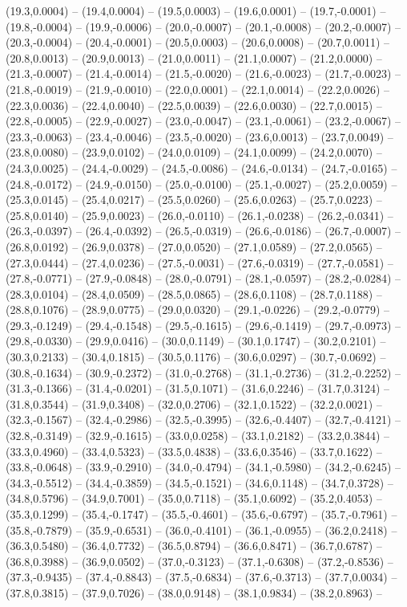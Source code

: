 \documentclass{SVnote}
\begin{document}
(19.3,0.0004) -- (19.4,0.0004) -- (19.5,0.0003) -- (19.6,0.0001) -- (19.7,-0.0001) -- (19.8,-0.0004) -- (19.9,-0.0006) -- (20.0,-0.0007) -- (20.1,-0.0008) -- (20.2,-0.0007) -- (20.3,-0.0004) -- (20.4,-0.0001) -- (20.5,0.0003) -- (20.6,0.0008) -- (20.7,0.0011) -- (20.8,0.0013) -- (20.9,0.0013) -- (21.0,0.0011) -- (21.1,0.0007) -- (21.2,0.0000) -- (21.3,-0.0007) -- (21.4,-0.0014) -- (21.5,-0.0020) -- (21.6,-0.0023) -- (21.7,-0.0023) -- (21.8,-0.0019) -- (21.9,-0.0010) -- (22.0,0.0001) -- (22.1,0.0014) -- (22.2,0.0026) -- (22.3,0.0036) -- (22.4,0.0040) -- (22.5,0.0039) -- (22.6,0.0030) -- (22.7,0.0015) -- (22.8,-0.0005) -- (22.9,-0.0027) -- (23.0,-0.0047) -- (23.1,-0.0061) -- (23.2,-0.0067) -- (23.3,-0.0063) -- (23.4,-0.0046) -- (23.5,-0.0020) -- (23.6,0.0013) -- (23.7,0.0049) -- (23.8,0.0080) -- (23.9,0.0102) -- (24.0,0.0109) -- (24.1,0.0099) -- (24.2,0.0070) -- (24.3,0.0025) -- (24.4,-0.0029) -- (24.5,-0.0086) -- (24.6,-0.0134) -- (24.7,-0.0165) -- (24.8,-0.0172) -- (24.9,-0.0150) -- (25.0,-0.0100) -- (25.1,-0.0027) -- (25.2,0.0059) -- (25.3,0.0145) -- (25.4,0.0217) -- (25.5,0.0260) -- (25.6,0.0263) -- (25.7,0.0223) -- (25.8,0.0140) -- (25.9,0.0023) -- (26.0,-0.0110) -- (26.1,-0.0238) -- (26.2,-0.0341) -- (26.3,-0.0397) -- (26.4,-0.0392) -- (26.5,-0.0319) -- (26.6,-0.0186) -- (26.7,-0.0007) -- (26.8,0.0192) -- (26.9,0.0378) -- (27.0,0.0520) -- (27.1,0.0589) -- (27.2,0.0565) -- (27.3,0.0444) -- (27.4,0.0236) -- (27.5,-0.0031) -- (27.6,-0.0319) -- (27.7,-0.0581) -- (27.8,-0.0771) -- (27.9,-0.0848) -- (28.0,-0.0791) -- (28.1,-0.0597) -- (28.2,-0.0284) -- (28.3,0.0104) -- (28.4,0.0509) -- (28.5,0.0865) -- (28.6,0.1108) -- (28.7,0.1188) -- (28.8,0.1076) -- (28.9,0.0775) -- (29.0,0.0320) -- (29.1,-0.0226) -- (29.2,-0.0779) -- (29.3,-0.1249) -- (29.4,-0.1548) -- (29.5,-0.1615) -- (29.6,-0.1419) -- (29.7,-0.0973) -- (29.8,-0.0330) -- (29.9,0.0416) -- (30.0,0.1149) -- (30.1,0.1747) -- (30.2,0.2101) -- (30.3,0.2133) -- (30.4,0.1815) -- (30.5,0.1176) -- (30.6,0.0297) -- (30.7,-0.0692) -- (30.8,-0.1634) -- (30.9,-0.2372) -- (31.0,-0.2768) -- (31.1,-0.2736) -- (31.2,-0.2252) -- (31.3,-0.1366) -- (31.4,-0.0201) -- (31.5,0.1071) -- (31.6,0.2246) -- (31.7,0.3124) -- (31.8,0.3544) -- (31.9,0.3408) -- (32.0,0.2706) -- (32.1,0.1522) -- (32.2,0.0021) -- (32.3,-0.1567) -- (32.4,-0.2986) -- (32.5,-0.3995) -- (32.6,-0.4407) -- (32.7,-0.4121) -- (32.8,-0.3149) -- (32.9,-0.1615) -- (33.0,0.0258) -- (33.1,0.2182) -- (33.2,0.3844) -- (33.3,0.4960) -- (33.4,0.5323) -- (33.5,0.4838) -- (33.6,0.3546) -- (33.7,0.1622) -- (33.8,-0.0648) -- (33.9,-0.2910) -- (34.0,-0.4794) -- (34.1,-0.5980) -- (34.2,-0.6245) -- (34.3,-0.5512) -- (34.4,-0.3859) -- (34.5,-0.1521) -- (34.6,0.1148) -- (34.7,0.3728) -- (34.8,0.5796) -- (34.9,0.7001) -- (35.0,0.7118) -- (35.1,0.6092) -- (35.2,0.4053) -- (35.3,0.1299) -- (35.4,-0.1747) -- (35.5,-0.4601) -- (35.6,-0.6797) -- (35.7,-0.7961) -- (35.8,-0.7879) -- (35.9,-0.6531) -- (36.0,-0.4101) -- (36.1,-0.0955) -- (36.2,0.2418) -- (36.3,0.5480) -- (36.4,0.7732) -- (36.5,0.8794) -- (36.6,0.8471) -- (36.7,0.6787) -- (36.8,0.3988) -- (36.9,0.0502) -- (37.0,-0.3123) -- (37.1,-0.6308) -- (37.2,-0.8536) -- (37.3,-0.9435) -- (37.4,-0.8843) -- (37.5,-0.6834) -- (37.6,-0.3713) -- (37.7,0.0034) -- (37.8,0.3815) -- (37.9,0.7026) -- (38.0,0.9148) -- (38.1,0.9834) -- (38.2,0.8963) -- 
\end{document}
